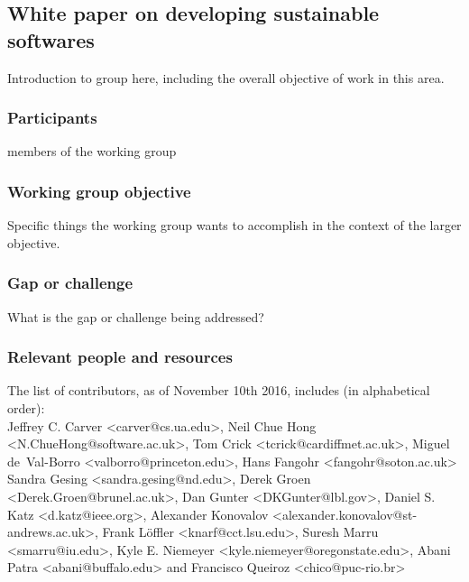 \subsection{White paper on developing sustainable softwares}
\label{sec:best-practices-developing}


Introduction to group here, including the overall objective of work in this area.

\subsubsection{Participants}

members of the working group

\subsubsection{Working group objective}

Specific things the working group wants to accomplish in the context of the larger objective.

\subsubsection{Gap or challenge}

What is the gap or challenge being addressed?

\subsubsection{Relevant people and resources}

The list of contributors, as of November 10th 2016, includes (in alphabetical order): \\
Jeffrey C. Carver <carver@cs.ua.edu>, 
Neil Chue Hong <N.ChueHong@software.ac.uk>, 
Tom Crick <tcrick@cardiffmet.ac.uk>, 
Miguel de~Val-Borro <valborro@princeton.edu>, 
Hans Fangohr <fangohr@soton.ac.uk>
Sandra Gesing <sandra.gesing@nd.edu>, 
Derek Groen <Derek.Groen@brunel.ac.uk>, 
Dan Gunter <DKGunter@lbl.gov>,
Daniel S. Katz <d.katz@ieee.org>,
Alexander Konovalov <alexander.konovalov@st-andrews.ac.uk>,
Frank L\"offler <knarf@cct.lsu.edu>,
Suresh Marru <smarru@iu.edu>,
Kyle E. Niemeyer <kyle.niemeyer@oregonstate.edu>,
Abani Patra <abani@buffalo.edu> 
and 
Francisco Queiroz <chico@puc-rio.br>


